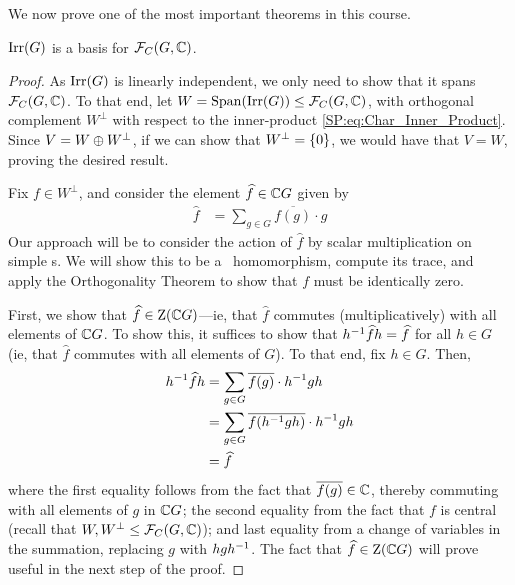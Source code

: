 We now prove one of the most important theorems in this course.

\begin{boxtheorem}\label{SP:Thm:Irred_Char_Basis}
    $\operatorname{Irr}\!\left( G \right)$ is a basis for $\mathcal{F}_C\!\left( G, \mathbb{C} \right)$.
\end{boxtheorem}
\begin{proof}
    As $\operatorname{Irr}\!\left( G \right)$ is linearly independent, we only need to show that it spans $\mathcal{F}_C\!\left( G, \mathbb{C} \right)$. To that end, let $W = \operatorname{Span}\!\left( \operatorname{Irr}\!\left( G \right) \right) \leq \mathcal{F}_C\!\left( G, \mathbb{C} \right)$, with orthogonal complement $W^\perp$ with respect to the inner-product \eqref{SP:eq:Char_Inner_Product}. Since $V = W \oplus W^\perp$, if we can show that $W^\perp = \left\{ 0 \right\}$, we would have that $V = W$, proving the desired result.

    Fix $f \in W^\perp$, and consider the element $\widehat{f} \in \mathbb{C} G$ given by  %
    \begin{align*}
        \hat{f} &= \sum_{g \in G} \overline{f(g)} \cdot g
    \end{align*}
    Our approach will be to consider the action of $\hat{f}$ by scalar multiplication on simple \CGM s. We will show this to be a \CGM\ homomorphism, compute its trace, and apply the Orthogonality Theorem to show that $f$ must be identically zero.

    First, we show that $\widehat{f} \in \operatorname{Z}\!\left( \mathbb{C} G \right)$---ie, that $\hat{f}$ commutes (multiplicatively) with all elements of $\mathbb{C} G$. To show this, it suffices to show that $h^{-1} \widehat{f} h = \widehat{f}$ for all $h \in G$ (ie, that $\hat{f}$ commutes with all elements of $G$). To that end, fix $h \in G$. Then,
    \begin{align*}
        h\inv \hat{f} h &=
        \sum_{g \in G} \overline{f(g)} \cdot h\inv g h \\
        &= \sum_{g \in G} \overline{\fof{h\inv g h}} \cdot h\inv g h \\ %
        &= \hat{f}
    \end{align*}
    where the first equality follows from the fact that $\overline{f(g)} \in \mathbb{C}$, thereby commuting with all elements of $g$ in $\mathbb{C} G$; the second equality from the fact that $f$ is central (recall that $W, W^{\perp} \leq \mathcal{F}_C\!\left( G, \mathbb{C} \right)$); and last equality from a change of variables in the summation, replacing $g$ with $hgh^{-1}$. The fact that $\widehat{f} \in \operatorname{Z}\!\left( \mathbb{C} G \right)$ will prove useful in the next step of the proof.


\end{proof}
